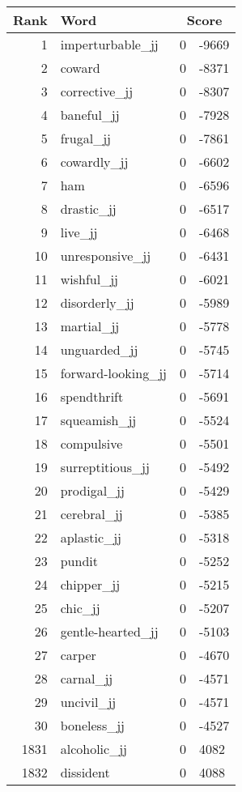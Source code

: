 \begin{longtable}[!htbp]{| rlr@{.}l |}
    \hline
    \textbf{Rank} & \textbf{Word} & \multicolumn{2}{c|}{\textbf{Score}} \\
    \hline
    \endhead
    1 & imperturbable\_jj & 0 & -9669 \\
    2 & coward & 0 & -8371 \\
    3 & corrective\_jj & 0 & -8307 \\
    4 & baneful\_jj & 0 & -7928 \\
    5 & frugal\_jj & 0 & -7861 \\
    6 & cowardly\_jj & 0 & -6602 \\
    7 & ham & 0 & -6596 \\
    8 & drastic\_jj & 0 & -6517 \\
    9 & live\_jj & 0 & -6468 \\
    10 & unresponsive\_jj & 0 & -6431 \\
    11 & wishful\_jj & 0 & -6021 \\
    12 & disorderly\_jj & 0 & -5989 \\
    13 & martial\_jj & 0 & -5778 \\
    14 & unguarded\_jj & 0 & -5745 \\
    15 & forward-looking\_jj & 0 & -5714 \\
    16 & spendthrift & 0 & -5691 \\
    17 & squeamish\_jj & 0 & -5524 \\
    18 & compulsive & 0 & -5501 \\
    19 & surreptitious\_jj & 0 & -5492 \\
    20 & prodigal\_jj & 0 & -5429 \\
    21 & cerebral\_jj & 0 & -5385 \\
    22 & aplastic\_jj & 0 & -5318 \\
    23 & pundit & 0 & -5252 \\
    24 & chipper\_jj & 0 & -5215 \\
    25 & chic\_jj & 0 & -5207 \\
    26 & gentle-hearted\_jj & 0 & -5103 \\
    27 & carper & 0 & -4670 \\
    28 & carnal\_jj & 0 & -4571 \\
    29 & uncivil\_jj & 0 & -4571 \\
    30 & boneless\_jj & 0 & -4527 \\
    1831 & alcoholic\_jj & 0 & 4082 \\
    1832 & dissident & 0 & 4088 \\

\end{longtable}
